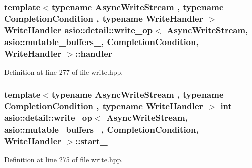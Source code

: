 \subsubsection[{handler\+\_\+}]{\setlength{\rightskip}{0pt plus 5cm}template$<$typename Async\+Write\+Stream , typename Completion\+Condition , typename Write\+Handler $>$ Write\+Handler {\bf asio\+::detail\+::write\+\_\+op}$<$ Async\+Write\+Stream, {\bf asio\+::mutable\+\_\+buffers\+\_},                           Completion\+Condition, Write\+Handler $>$\+::handler\+\_\+}\label{classasio_1_1detail_1_1write__op_3_01_async_write_stream_00_01asio_1_1mutable__buffers__1_00_01_203e79af9e8ed472722d2a863f7168cc_a739503b7d3fb902fe1cfdd006921279c}


Definition at line 277 of file write.\+hpp.

\hypertarget{classasio_1_1detail_1_1write__op_3_01_async_write_stream_00_01asio_1_1mutable__buffers__1_00_01_203e79af9e8ed472722d2a863f7168cc_a17fc0b35542316cc467061ada86393b5}{}
\subsubsection[{start\+\_\+}]{\setlength{\rightskip}{0pt plus 5cm}template$<$typename Async\+Write\+Stream , typename Completion\+Condition , typename Write\+Handler $>$ int {\bf asio\+::detail\+::write\+\_\+op}$<$ Async\+Write\+Stream, {\bf asio\+::mutable\+\_\+buffers\+\_},                           Completion\+Condition, Write\+Handler $>$\+::start\+\_\+}\label{classasio_1_1detail_1_1write__op_3_01_async_write_stream_00_01asio_1_1mutable__buffers__1_00_01_203e79af9e8ed472722d2a863f7168cc_a17fc0b35542316cc467061ada86393b5}


Definition at line 275 of file write.\+hpp.

